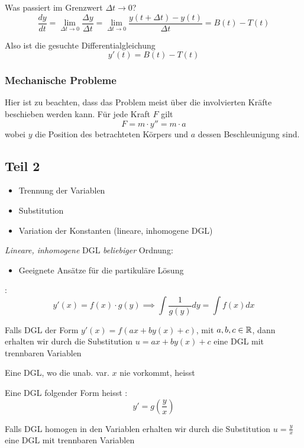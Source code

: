 Was passiert im Grenzwert $\Delta t \to 0$?
$$\frac{dy}{dt} = \lim_{\Delta t \to 0} \frac{\Delta y}{\Delta t} = \lim_{\Delta t \to 0}\frac{y(t + \Delta t) - y(t)}{\Delta t} = B(t) - T(t)$$

Also ist die gesuchte Differentialgleichung
$$y'(t) = B(t) - T(t)$$

\subsubsection{Mechanische Probleme}

Hier ist zu beachten, dass das Problem meist über die involvierten Kräfte beschieben werden kann.
Für jede Kraft $F$ gilt
$$F = m \cdot y'' = m \cdot a$$
wobei $y$ die Position des betrachteten Körpers und $a$ dessen Beschleunigung sind.

\subsection{Teil 2}

\begin{itemize}
    \item Trennung der Variablen
    \item Substitution
    \item Variation der Konstanten (lineare, inhomogene DGL)
\end{itemize}
\textit{Lineare, inhomogene} DGL \textit{beliebiger} Ordnung:
\vspace{-0.6em}
\begin{itemize}
    \item Geeignete Ansätze für die partikuläre Lösung
\end{itemize}

\Satz {}:
$$y'(x) = f(x) \cdot g(y) \implies \int \frac{1}{g(y)} dy = \int f(x) dx$$

\Satz {} Falls DGL der Form
$y'(x) = f(ax + by(x) + c)$, mit $a, b, c \in \mathbb{R}$, dann erhalten wir durch die
Substitution $u = ax + by(x) + c$ eine DGL mit trennbaren Variablen

\Def Eine DGL, wo die unab. var. $x$ nie vorkommt, heisst 

\Def Eine DGL folgender Form heisst :
$$y' = g\left(\frac{y}{x}\right)$$

\Satz {} Falls DGL homogen in den Variablen
erhalten wir durch die Substitution $u = \frac{y}{x}$ eine DGL mit trennbaren Variablen

